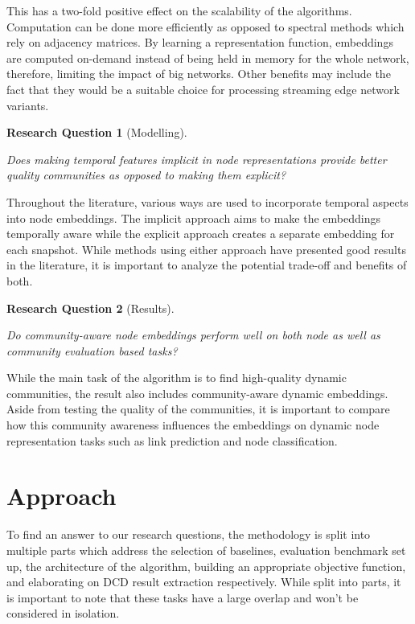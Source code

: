 \documentclass[
acmsmall,
nonacm,
screen,
acmthm]{acmart}
\newtheorem{rqq}{Research Question}
\begin{document}
This has a two-fold positive effect on the scalability of the
algorithms. Computation can be done more efficiently as opposed to
spectral methods which rely on adjacency matrices. By learning a
representation function, embeddings are computed on-demand instead of
being held in memory for the whole network, therefore, limiting the
impact of big networks. Other benefits may include the fact that they
would be a suitable choice for processing streaming edge network
variants.

\begin{rqq}[Modelling]\label{rqq:rq3} 

\emph{Does making temporal features implicit in node representations
provide better quality communities as opposed to making them explicit?}

\end{rqq}

Throughout the literature, various ways are used to incorporate temporal
aspects into node embeddings. The implicit approach aims to make the
embeddings temporally aware while the explicit approach creates a
separate embedding for each snapshot. While methods using either
approach have presented good results in the literature, it is important
to analyze the potential trade-off and benefits of both.

\begin{rqq}[Results]\label{rqq:rq4} 

\emph{Do community-aware node embeddings perform well on both node as
well as community evaluation based tasks?}

\end{rqq}

While the main task of the algorithm is to find high-quality dynamic
communities, the result also includes community-aware dynamic
embeddings. Aside from testing the quality of the communities, it is
important to compare how this community awareness influences the
embeddings on dynamic node representation tasks such as link prediction
and node classification.

\hypertarget{approach}{%
\section{Approach}\label{approach}}

To find an answer to our research questions, the methodology is split
into multiple parts which address the selection of baselines, evaluation
benchmark set up, the architecture of the algorithm, building an
appropriate objective function, and elaborating on DCD result extraction
respectively. While split into parts, it is important to note that these
tasks have a large overlap and won't be considered in isolation.
\end{document}
